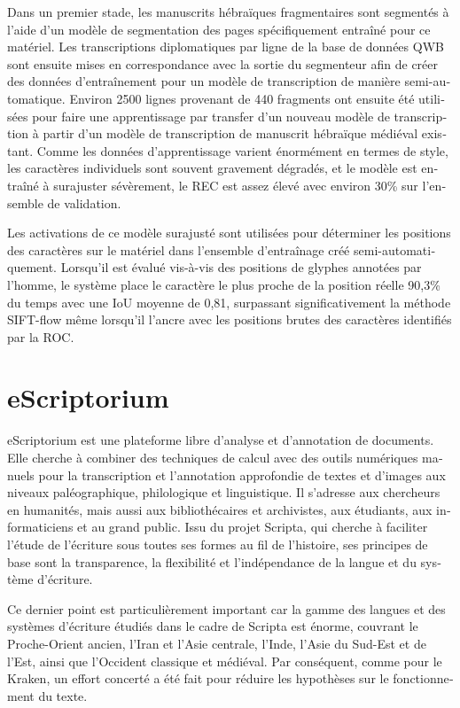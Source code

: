 \begin{french}
Dans un premier stade, les manuscrits hébraïques fragmentaires sont segmentés à
l'aide d'un modèle de segmentation des pages spécifiquement entraîné pour ce
matériel. Les transcriptions diplomatiques par ligne de la base de données QWB
sont ensuite mises en correspondance avec la sortie du segmenteur afin de créer
des données d'entraînement pour un modèle de transcription de manière
semi-automatique. Environ 2500 lignes provenant de 440 fragments ont ensuite
été utilisées pour faire une apprentissage par transfer d'un nouveau modèle de
transcription à partir d'un modèle de transcription de manuscrit hébraïque
médiéval existant.  Comme les données d'apprentissage varient énormément en
termes de style, les caractères individuels sont souvent gravement dégradés, et
le modèle est entraîné à surajuster sévèrement, le REC est assez élevé avec
environ 30\% sur l'ensemble de validation.

Les activations de ce modèle surajusté sont utilisées pour déterminer les
positions des caractères sur le matériel dans l'ensemble d'entraînage créé
semi-auto\-ma\-ti\-que\-ment. Lorsqu'il est évalué vis-à-vis des positions de glyphes
annotées par l'homme, le système place le caractère le plus proche de la
position réelle 90,3\% du temps avec une IoU moyenne de 0,81, surpassant
significativement la méthode SIFT-flow même lorsqu'il l'ancre avec les
positions brutes des caractères identifiés par la ROC.

\section{eScriptorium}

eScriptorium est une plateforme libre d'analyse et d'annotation de documents.
Elle cherche à combiner des techniques de calcul avec des outils numériques
manuels pour la transcription et l'annotation approfondie de textes et d'images
aux niveaux paléographique, philologique et linguistique. Il s'adresse aux
chercheurs en humanités, mais aussi aux bibliothécaires et archivistes, aux
étudiants, aux informaticiens et au grand public. Issu du projet Scripta, qui
cherche à faciliter l'étude de l'écriture sous toutes ses formes au fil de
l'histoire, ses principes de base sont la transparence, la flexibilité et
l'indépendance de la langue et du système d'écriture.

Ce dernier point est particulièrement important car la gamme des langues et des
systèmes d'écriture étudiés dans le cadre de Scripta est énorme, couvrant le
Proche-Orient ancien, l'Iran et l'Asie centrale, l'Inde, l'Asie du Sud-Est et
de l'Est, ainsi que l'Occident classique et médiéval. Par conséquent, comme
pour le Kraken, un effort concerté a été fait pour réduire les hypothèses sur
le fonctionnement du texte.


\end{french}
